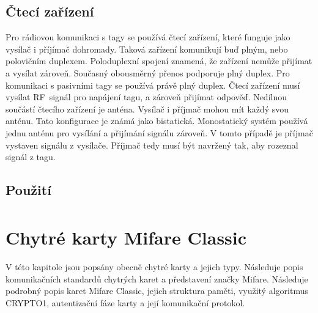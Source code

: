\section{Čtecí zařízení}
Pro rádiovou komunikaci s tagy se používá čtecí zařízení, které funguje jako vysílač i příjímač dohromady. Taková zařízení komunikují buď plným, nebo polovičním duplexem. Poloduplexní spojení znamená, že zařízení nemůže přijímat a vysílat zároveň. Současný obousměrný přenos podporuje plný duplex. Pro komunikaci s pasivními tagy se používá právě plný duplex. Čtecí zařízení musí vysílat RF~signál pro napájení tagu, a zároveň přijímat odpověď.
Nedílnou součástí čtecího zařízení je anténa. Vysílač i příjmač mohou mít každý svou anténu. Tato konfigurace je známá jako bistatická. Monostatický systém používá jednu anténu pro vysílání a přijímání signálu zároveň. V tomto případě je příjmač vystaven signálu z vysílače. Příjmač tedy musí být navržený tak, aby rozeznal signál z tagu\cite{The_RF_in_RFID}.\par

\section{Použití}

\chapter{Chytré karty Mifare Classic\textsuperscript{\textregistered}}
\label{chytre_karty}
V této kapitole jsou popsány obecně chytré karty a jejich typy. Následuje popis komunikačních standardů chytrých karet a představení značky Mifare. Následuje podrobný popis karet Mifare Classic, jejich struktura paměti, využitý algoritmus CRYPTO1, autentizační fáze karty a její komunikační protokol.

